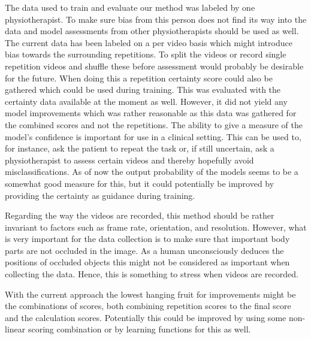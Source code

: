 The data used to train and evaluate our method was labeled by one physiotherapist. To make sure bias from this person does not find its way into the data and model assessments from other physiotherapists should be used as well. The current data has been labeled on a per video basis which might introduce bias towards the surrounding repetitions. To split the videos or record single repetition videos and shuffle these before assessment would probably be desirable for the future. When doing this a repetition certainty score could also be gathered which could be used during training. This was evaluated with the certainty data available at the moment as well. However, it did not yield any model improvements which was rather reasonable as this data was gathered for the combined scores and not the repetitions. The ability to give a measure of the model's confidence is important for use in a clinical setting. This can be used to, for instance, ask the patient to repeat the task or, if still uncertain, ask a physiotherapist to assess certain videos and thereby hopefully avoid misclassifications. As of now the output probability of the models seems to be a somewhat good measure for this, but it could potentially be improved by providing the certainty as guidance during training. %

Regarding the way the videos are recorded, this method should be rather invariant to factors such as frame rate, orientation, and resolution. However, what is very important for the data collection is to make sure that important body parts are not occluded in the image. As a human unconsciously deduces the positions of occluded objects this might not be considered as important when collecting the data. Hence, this is something to stress when videos are recorded.

With the current approach the lowest hanging fruit for improvements might be the combinations of scores, both combining repetition scores to the final score and the calculation scores. Potentially this could be improved by using some non-linear scoring combination or by learning functions for this as well.



